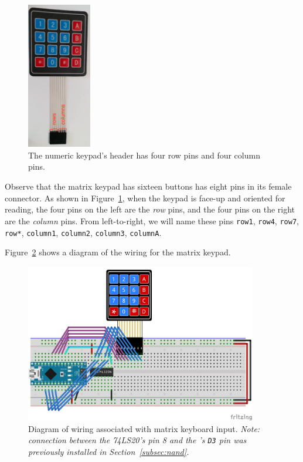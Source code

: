 \begin{figure}
    \centering
    \includegraphics[width=0.25\textwidth]{keypad/keypad-annotated}
    \caption{The numeric keypad's header has four row pins and four column pins. \label{fig:keypad-annotated}}
\end{figure}

Observe that the matrix keypad has sixteen buttons has eight pins in its female connector.
As shown in Figure~\ref{fig:keypad-annotated}, when the keypad is face-up and oriented for reading, the four pins on the left are the \textit{row} pins, and the four pins on the right are the \textit{column} pins.
From left-to-right, we will name these pins \texttt{row1}, \texttt{row4}, \texttt{row7}, \texttt{row*}, \texttt{column1}, \texttt{column2}, \texttt{column3}, \texttt{columnA}.

Figure~\ref{fig:keypad-diagram} shows a diagram of the wiring for the matrix keypad.

\begin{figure}[p]
    \centering
    \includegraphics[width=0.9\textwidth]{fritzing_diagrams/keypad}
    \caption{Diagram of wiring associated with matrix keyboard input.
        \textit{Note: connection between the 74LS20's pin 8 and the \developmentboard's
        \texttt{D3} pin was previously installed in Section~\ref{subsec:nand}.}
        \label{fig:keypad-diagram}}
\end{figure}

